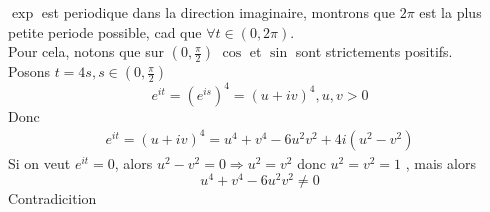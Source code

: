 \documentclass[../main.tex]{subfiles}
\begin{document}
$\exp$ est periodique dans la direction imaginaire, montrons que $2\pi$ est la plus petite periode possible, cad que $\forall t \in ( 0, 2\pi) $.\\
Pour cela, notons que sur $ ( 0,\frac{\pi}{2}) $ $\cos$ et $\sin$ sont strictements positifs.\\
Posons $t= 4s, s \in ( 0, \frac{\pi}{2}) $ \\
\[ 
	e^{it} = ( e^{is} ) ^{4} = ( u+iv) ^{4}, u,v >0 
\]
Donc
\begin{align*}
	e^{it} = ( u+iv)^{4} = u^{4}+ v^{4} - 6 u^{2}v^{2} + 4 i ( u^{2}-v^{2}) 
\end{align*}
Si on veut $ e^{it}=0 $, alors $u^{2}-v^{2} =0 \Rightarrow u^{2}=v^{2}$ donc $ u^{2}= v^{2}=1$ , mais alors 
\[ 
u^{4}+v^{4}- 6 u^{2}v^{2}\neq 0
\]
Contradicition
\end{document}
